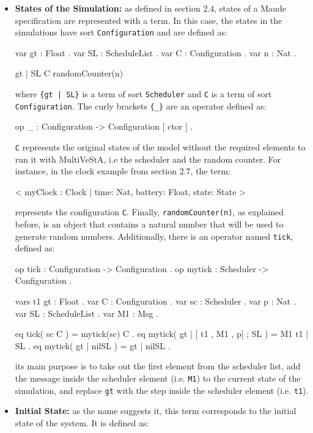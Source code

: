 \begin{itemize}
    \item \textbf{States of the Simulation:} as defined in section 2.4, states of a Maude specification are represented with a term. In this case, the states in the simulations have sort \texttt{Configuration} and are defined as:
    \begin{maude}

var gt : Float .
var SL : ScheduleList .
var C : Configuration .
var n : Nat .

{gt | SL} {C randomCounter(n)} \end{maude}
    where \texttt{\{gt | SL\}} is a term of sort \texttt{Scheduler} and \texttt{C} is a term of sort \texttt{Configuration}. The curly brackets \texttt{\{\_\}} are an operator defined as: 
    \begin{maude}
    
op { _ } : Configuration -> Configuration [ ctor ] . \end{maude}
    \texttt{C} represents the original states of the model without the required elements to run it with MultiVeStA, i.e the scheduler and the random counter. For instance, in the clock example from section 2.7, the term: 
    \begin{maude}
    
< myClock : Clock | time: Nat, battery: Float, state: State > \end{maude}
    represents the configuration \texttt{C}. Finally, \texttt{randomCounter(n)}, as explained before, is an object that contains a natural number that will be used to generate random numbers. Additionally, there is an operator named \texttt{tick}, defined as:
    \begin{maude}

op tick : Configuration -> Configuration .
op mytick : Scheduler -> Configuration .

vars t1 gt : Float .
var C : Configuration .
var sc : Scheduler .
var p : Nat .
var SL : ScheduleList .
var M1 : Msg .

eq tick( sc C ) = mytick(sc) C .
eq mytick({ gt | [ t1 , M1 , p] ; SL }) = M1 { t1 | SL } .
eq mytick({ gt | nilSL }) = { gt | nilSL } . \end{maude}
    its main purpose is to take out the first element from the scheduler list, add the message inside the scheduler element (i.e. \texttt{M1}) to the current state of the simulation, and replace \texttt{gt} with the step inside the scheduler element (i.e. \texttt{t1}).  
 
    \item\textbf{Initial State:} as the name suggests it, this term corresponds to the initial state of the system. It is defined as:
    \begin{maude}


\end{maude}
\end{itemize}
